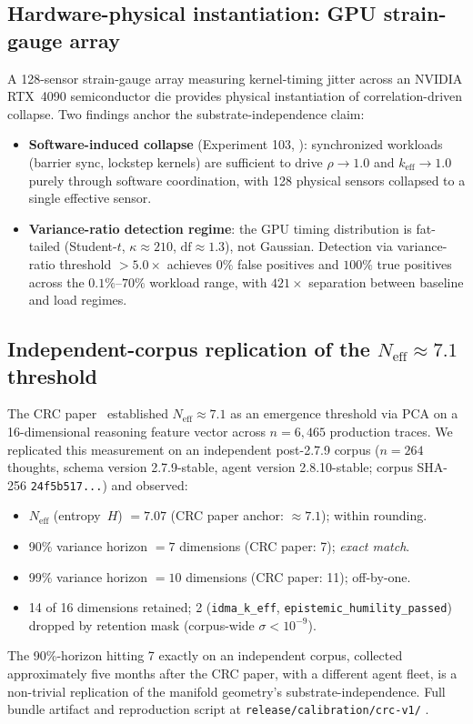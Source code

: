 \documentclass[11pt,a4paper]{article}
\begin{document}
\subsection{Hardware-physical instantiation: GPU strain-gauge array}
\label{sec:gpu-instantiation}
A 128-sensor strain-gauge array measuring kernel-timing jitter across an NVIDIA RTX~4090 semiconductor die provides physical instantiation of correlation-driven collapse. Two findings anchor the substrate-independence claim:

\begin{itemize}
  \item \textbf{Software-induced collapse} (Experiment 103, \cite{moore_cca_2026}): synchronized workloads (barrier sync, lockstep kernels) are sufficient to drive $\rho \to 1.0$ and $k_{\text{eff}} \to 1.0$ purely through software coordination, with 128 physical sensors collapsed to a single effective sensor.
  \item \textbf{Variance-ratio detection regime}: the GPU timing distribution is fat-tailed (Student-$t$, $\kappa \approx 210$, $\text{df} \approx 1.3$), not Gaussian. Detection via variance-ratio threshold $> 5.0\times$ achieves $0\%$ false positives and $100\%$ true positives across the $0.1\%$--$70\%$ workload range, with $421\times$ separation between baseline and load regimes.
\end{itemize}

\subsection{Independent-corpus replication of the $N_{\text{eff}} \approx 7.1$ threshold}
\label{sec:replication}
The CRC paper~\cite{moore_crc_2026} established $N_{\text{eff}} \approx 7.1$ as an emergence threshold via PCA on a 16-dimensional reasoning feature vector across $n=6{,}465$ production traces. We replicated this measurement on an independent post-2.7.9 corpus ($n=264$ thoughts, schema version 2.7.9-stable, agent version 2.8.10-stable; corpus SHA-256 \texttt{24f5b517...}) and observed:
\begin{itemize}
  \item $N_{\text{eff}}$ (entropy~$H$) $= 7.07$ (CRC paper anchor: $\approx 7.1$); within rounding.
  \item 90\% variance horizon $= 7$ dimensions (CRC paper: 7); \emph{exact match}.
  \item 99\% variance horizon $= 10$ dimensions (CRC paper: 11); off-by-one.
  \item 14 of 16 dimensions retained; 2 (\texttt{idma\_k\_eff}, \texttt{epistemic\_humility\_passed}) dropped by retention mask (corpus-wide $\sigma < 10^{-9}$).
\end{itemize}
The 90\%-horizon hitting 7 exactly on an independent corpus, collected approximately five months after the CRC paper, with a different agent fleet, is a non-trivial replication of the manifold geometry's substrate-independence. Full bundle artifact and reproduction script at \texttt{release/calibration/crc-v1/} \cite{ratchet_v01_bundle}.
\end{document}
